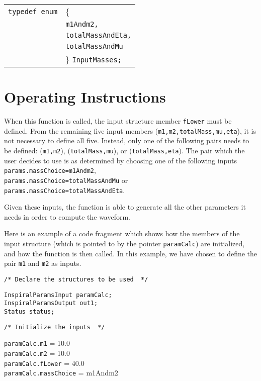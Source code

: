 \documentclass[12pt]{article}
\begin{document}
\vspace{5mm}

\begin{tabular}{ll}
\texttt{typedef enum} & \{ \\
                      & \texttt{m1Andm2,} \\
                      & \texttt{totalMassAndEta,}  \\
                      & \texttt{totalMassAndMu} \\
                      & \} \texttt{InputMasses;}
\end{tabular}

\vspace{5mm}



\section{Operating Instructions}

When this function is called, the input structure member \texttt{fLower} must be defined. From the remaining five input members (\texttt{m1,m2,totalMass,mu,eta}), it is not necessary to define all five. Instead, only  one of the following pairs needs to be defined: (\texttt{m1,m2}), (\texttt{totalMass,mu}), or (\texttt{totalMass,eta}). The pair which the user decides to use is as determined by choosing one of the following inputs \\ \texttt{params.massChoice=m1Andm2}, \\ \texttt{params.massChoice=totalMassAndMu} or \\ \texttt{params.massChoice=totalMassAndEta}.

Given these inputs, the function is able to generate all the other parameters it needs in order to compute the waveform.

Here is an example of a code fragment which shows how the members of the input structure (which is pointed to by the pointer \texttt{paramCalc}) are initialized, and how the function is then called. In this example, we have chosen to define the pair \texttt{m1} and \texttt{m2} as inputs.


\vspace{5mm}

\noindent
\begin{verbatim}
/* Declare the structures to be used  */
\end{verbatim}
\texttt{InspiralParamsInput paramCalc;} \\
\texttt{InspiralParamsOutput out1;} \\
\texttt{Status status;} \\
\begin{verbatim}
/* Initialize the inputs  */
\end{verbatim}
\texttt{paramCalc.m1} = 10.0 \\
\texttt{paramCalc.m2} = 10.0 \\
\texttt{paramCalc.fLower} = 40.0 \\
\texttt{paramCalc.massChoice} = m1Andm2 \\
\end{document}
